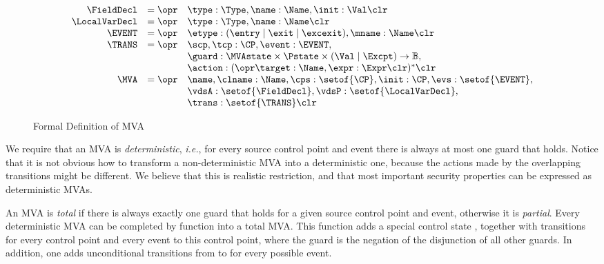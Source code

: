 \begin{figure}[t]
\[
\begin{array}{rcl}
\FieldDecl & = \opr & \type : \Type, \name : \Name, \init : \Val
\clr \\ 
\LocalVarDecl & = \opr & \type : \Type, \name : \Name \clr \\
\EVENT & = \opr & \etype : (\entry \mid \exit \mid \excexit), 
                 \mname : \Name \clr\\
\TRANS & = \opr & \scp, \tcp : \CP, \event : \EVENT, \\
& & 
\guard : \MVAstate \times \Pstate \times (\Val \mid \Excpt) \rightarrow \mathbb{B}, \\
&& \action : (\opr \target : \Name, \expr : \Expr \clr)^* \clr\\
\MVA & = \opr & \name, \clname : \Name, \cps : \setof{\CP},
            \init : \CP, \evs : \setof{\EVENT},\\
     &   &  \vdsA : \setof{\FieldDecl}, \vdsP : \setof{\LocalVarDecl},\\
     &   &  \trans : \setof{\TRANS} \clr
\end{array}
\]
\caption{Formal Definition of MVA}\label{FigMVAForm}
\end{figure}

We require that an MVA is \emph{deterministic}, \emph{i.e.}, for every
source control point and event there is always at most one guard that
holds. Notice that it is not obvious how to transform a
non-deterministic MVA into a deterministic one, because the actions
made by the overlapping transitions might be different. We believe
that this is realistic restriction, and that most important security
properties can be expressed as deterministic MVAs.

An MVA is \emph{total} if there is always exactly one guard that holds
for a given source control point and event, otherwise it is
\emph{partial}. Every deterministic MVA can be completed by function
\complete into a total
MVA. This function adds a special control state
\halted, together with transitions for every control point and every event
to this \halted control point, where the guard is the negation of the
disjunction of all other guards. In addition, one adds unconditional
transitions from \halted to \halted for every possible
event. 


